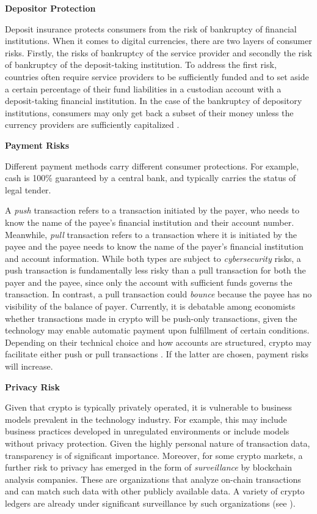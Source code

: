 \documentclass[12pt]{article}
\newcommand{\1}{\mathbbm 1}
\begin{document}
		
		
		\textbf{Depositor Protection}
		
		Deposit insurance protects consumers from the risk of bankruptcy of
		financial institutions. When it comes to digital currencies, there are two layers of consumer risks. Firstly, the risks of bankruptcy of the service provider and secondly the risk of bankruptcy of the deposit-taking institution. To address the first risk, countries often require service providers to be sufficiently funded and to set aside a certain percentage of their fund liabilities in a custodian account with a deposit-taking financial institution. In the case of the bankruptcy of depository institutions, consumers may only get back a subset of their money unless the currency providers are sufficiently capitalized \cite{WEF2021governance}.
		
		
		
		\textbf{Payment Risks}
		
		Different payment methods carry different consumer
		protections. For example, cash is 100\% guaranteed
		by a central bank, and typically carries the status
		of legal tender.
		
		A \textit{push} transaction refers to a transaction initiated by the payer, who needs to know the name of the payee's financial institution and their account number. Meanwhile, \textit{pull} transaction refers to a transaction where it is initiated by the payee and the payee needs to know the name of the payer's financial institution and account information. While both types are subject to \textit{cybersecurity} risks, a push transaction is fundamentally less risky than a pull transaction for both the payer and the payee, since only the account
		with sufficient funds governs the transaction. In contrast, a pull transaction could \textit{bounce} because the payee has no visibility of the balance of payer. Currently, it is debatable among economists whether transactions made in crypto
		will be push-only transactions, given the technology may enable automatic payment upon fulfillment of certain conditions. Depending on their technical
		choice and how accounts are structured, crypto may facilitate either push or pull transactions \cite{WEF2021governance}. If the latter are chosen, payment risks will increase.
		
		\textbf{Privacy Risk}
		
		Given that crypto is typically privately operated, it is vulnerable to business models prevalent in the technology industry. For example, this may include business practices developed in unregulated environments or include models
		without privacy protection. Given the highly personal nature of transaction data, transparency is of significant importance. Moreover, for some crypto markets, a further risk to privacy has emerged in the form of \textit{surveillance} by blockchain analysis companies. These are organizations that analyze on-chain transactions and can match such data with other publicly available data. A variety of crypto ledgers are already under significant surveillance by such organizations (see \cite{WEF2021governance}).
		
\end{document}
